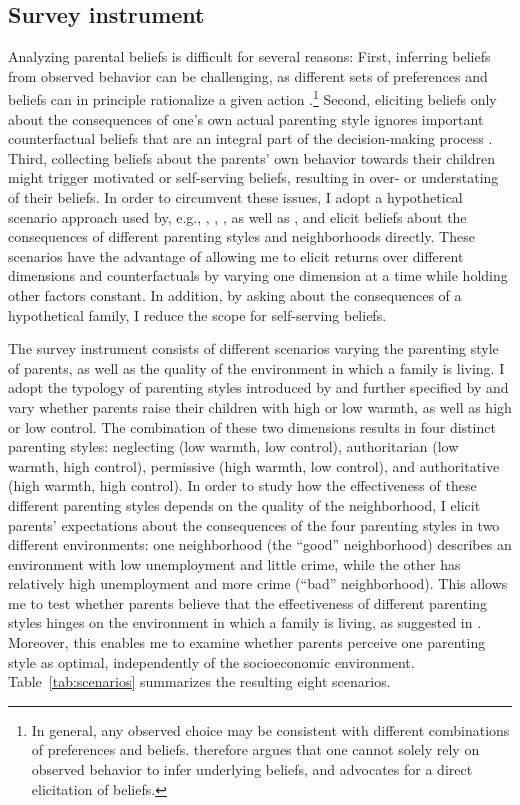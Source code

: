 \documentclass[12pt, a4paper, english]{article}
\begin{document}
\subsection{Survey instrument}
Analyzing parental beliefs is difficult for several reasons: First, inferring beliefs from observed behavior can be challenging, as different sets of preferences and beliefs can in principle rationalize a given action \citep{Manski2004}.\footnote{In general, any observed choice may be consistent with different combinations of preferences and beliefs. \citet{Manski2004} therefore argues that one cannot solely rely on observed behavior to infer underlying beliefs, and advocates for a direct elicitation of beliefs.} Second, eliciting beliefs only about the consequences of one's own actual parenting style ignores important counterfactual beliefs that are an integral part of the decision-making process \citep{Arcidiaconoetal2012}. Third, collecting beliefs about the parents' own behavior towards their children might trigger motivated or self-serving beliefs, resulting in over- or understating of their beliefs. In order to circumvent these issues, I adopt a hypothetical scenario approach used by, e.g., \citet{CunhaEloCulhane2015}, \citet{BonevaRauh2018}, \citet{Attanasioetal2018}, as well as \citet{Bhalotraetal2017}, and elicit beliefs about the consequences of different parenting styles and neighborhoods directly. These scenarios have the advantage of allowing me to elicit returns over different dimensions and counterfactuals by varying one dimension at a time while holding other factors constant. In addition, by asking about the consequences of a hypothetical family, I reduce the scope for self-serving beliefs.

The survey instrument consists of different scenarios varying the parenting style of parents, as well as the quality of the environment in which a family is living. I adopt the typology of parenting styles introduced by \citet{Baumrind1967} and further specified by \citet{MaccobyMartin1983} and vary whether parents raise their children with high or low warmth, as well as high or low control. The combination of these two dimensions results in four distinct parenting styles: neglecting (low warmth, low control), authoritarian (low warmth, high control), permissive (high warmth, low control), and authoritative (high warmth, high control). In order to study how the effectiveness of these different parenting styles depends on the quality of the neighborhood, I elicit parents' expectations about the consequences of the four parenting styles in two different environments: one neighborhood (the ``good'' neighborhood) describes an environment with low unemployment and little crime, while the other has relatively high unemployment and more crime (``bad'' neighborhood). This allows me to test whether parents believe that the effectiveness of different parenting styles hinges on the environment in which a family is living, as suggested in \citet{DoepkeZilibotti2017}. Moreover, this enables me to examine whether parents perceive one parenting style as optimal, independently of the socioeconomic environment. Table~\ref{tab:scenarios} summarizes the resulting eight scenarios.
\end{document}
